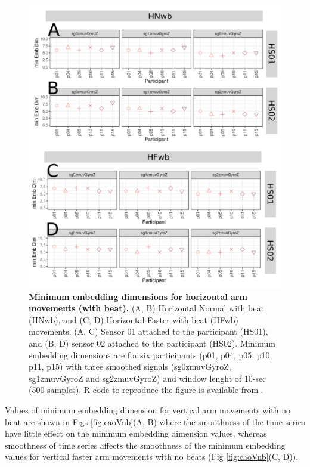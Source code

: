 \begin{figure}[!h]
\centering
\includegraphics[width=1.0\textwidth]{cao_Hwb_w10}
	\caption{
	{\bf Minimum embedding dimensions for horizontal arm movements 
	(with beat).} 
		(A, B) Horizontal Normal with beat (HNwb), and
		(C, D) Horizontal Faster with beat (HFwb) movements.
		(A, C) Sensor 01 attached to the participant (HS01), and
		(B, D) sensor 02 attached to the participant (HS02).
		Minimum embedding dimensions are for six participants 
		(p01, p04, p05, p10, p11, p15) with three smoothed signals 
		(sg0zmuvGyroZ, sg1zmuvGyroZ and sg2zmuvGyroZ)
		and window lenght of 10-sec (500 samples).
		R code to reproduce the figure is available 
		from \cite{hwum2018}.
        }
    \label{fig:caoHwb}
\end{figure}


Values of minimum embedding dimension for vertical arm movements with no beat
are shown in Figs \ref{fig:caoVnb}(A, B) where the smoothness 
of the time series have little effect on the minimum embedding dimension 
values, whereas smoothness of time series affects the smoothness of the 
minimum embedding values for vertical faster arm movements with no beats 
(Fig \ref{fig:caoVnb}(C, D)).

